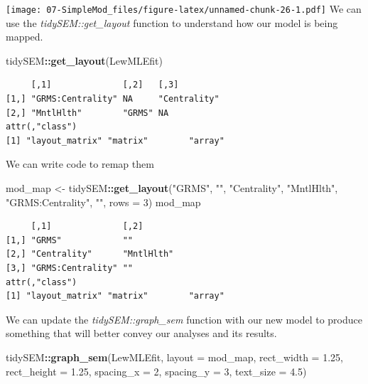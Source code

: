 \documentclass[
  11pt,
]{book}
\newenvironment{Shaded}{\begin{snugshade}}{\end{snugshade}}
\newcommand{\AttributeTok}[1]{\textcolor[rgb]{0.27,0.27,0.27}{#1}}
\newcommand{\DecValTok}[1]{\textcolor[rgb]{0.06,0.06,0.06}{#1}}
\newcommand{\FloatTok}[1]{\textcolor[rgb]{0.06,0.06,0.06}{#1}}
\newcommand{\FunctionTok}[1]{\textcolor[rgb]{0.27,0.27,0.27}{\textbf{#1}}}
\newcommand{\NormalTok}[1]{#1}
\newcommand{\OtherTok}[1]{\textcolor[rgb]{0.37,0.37,0.37}{#1}}
\newcommand{\SpecialCharTok}[1]{\textcolor[rgb]{0.43,0.43,0.43}{\textbf{#1}}}
\newcommand{\StringTok}[1]{\textcolor[rgb]{0.5,0.5,0.5}{#1}}
\begin{document}
\texttt{[image: 07-SimpleMod\_files/figure-latex/unnamed-chunk-26-1.pdf]} We can use the \emph{tidySEM::get\_layout} function to understand how our model is being mapped.

\begin{Shaded}
\begin{Highlighting}[]
\NormalTok{tidySEM}\SpecialCharTok{::}\FunctionTok{get\_layout}\NormalTok{(LewMLEfit)}
\end{Highlighting}
\end{Shaded}

\begin{verbatim}
     [,1]              [,2]   [,3]        
[1,] "GRMS:Centrality" NA     "Centrality"
[2,] "MntlHlth"        "GRMS" NA          
attr(,"class")
[1] "layout_matrix" "matrix"        "array"        
\end{verbatim}

We can write code to remap them

\begin{Shaded}
\begin{Highlighting}[]
\NormalTok{mod\_map }\OtherTok{\textless{}{-}}\NormalTok{ tidySEM}\SpecialCharTok{::}\FunctionTok{get\_layout}\NormalTok{(}\StringTok{"GRMS"}\NormalTok{, }\StringTok{""}\NormalTok{, }\StringTok{"Centrality"}\NormalTok{, }\StringTok{"MntlHlth"}\NormalTok{, }\StringTok{"GRMS:Centrality"}\NormalTok{,}
    \StringTok{""}\NormalTok{, }\AttributeTok{rows =} \DecValTok{3}\NormalTok{)}
\NormalTok{mod\_map}
\end{Highlighting}
\end{Shaded}

\begin{verbatim}
     [,1]              [,2]      
[1,] "GRMS"            ""        
[2,] "Centrality"      "MntlHlth"
[3,] "GRMS:Centrality" ""        
attr(,"class")
[1] "layout_matrix" "matrix"        "array"        
\end{verbatim}

We can update the \emph{tidySEM::graph\_sem} function with our new model to produce something that will better convey our analyses and its results.

\begin{Shaded}
\begin{Highlighting}[]
\NormalTok{tidySEM}\SpecialCharTok{::}\FunctionTok{graph\_sem}\NormalTok{(LewMLEfit, }\AttributeTok{layout =}\NormalTok{ mod\_map, }\AttributeTok{rect\_width =} \FloatTok{1.25}\NormalTok{, }\AttributeTok{rect\_height =} \FloatTok{1.25}\NormalTok{,}
    \AttributeTok{spacing\_x =} \DecValTok{2}\NormalTok{, }\AttributeTok{spacing\_y =} \DecValTok{3}\NormalTok{, }\AttributeTok{text\_size =} \FloatTok{4.5}\NormalTok{)}
\end{Highlighting}
\end{Shaded}
\end{document}
